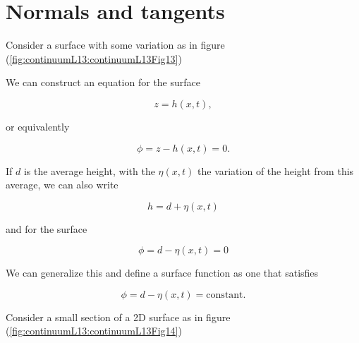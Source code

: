 \section{Normals and tangents}


Consider a surface with some variation as in figure (\ref{fig:continuumL13:continuumL13Fig13})


We can construct an equation for the surface

\begin{equation}\label{eqn:continuumL13:160}
z = h(x, t),
\end{equation}

or equivalently

\begin{equation}\label{eqn:continuumL13:180}
\phi = z - h(x, t) = 0.
\end{equation}

If $d$ is the average height, with the $\eta(x,t)$ the variation of the height from this average, we can also write

\begin{equation}\label{eqn:continuumL13:200}
h = d + \eta(x, t)
\end{equation}

and for the surface

\begin{equation}\label{eqn:continuumL13:220}
\phi = d - \eta(x, t) = 0
\end{equation}

We can generalize this and define a surface function as one that satisfies

\begin{equation}\label{eqn:continuumL13:220b}
\phi = d - \eta(x, t) = \text{constant}.
\end{equation}

Consider a small section of a 2D surface as in figure (\ref{fig:continuumL13:continuumL13Fig14})

